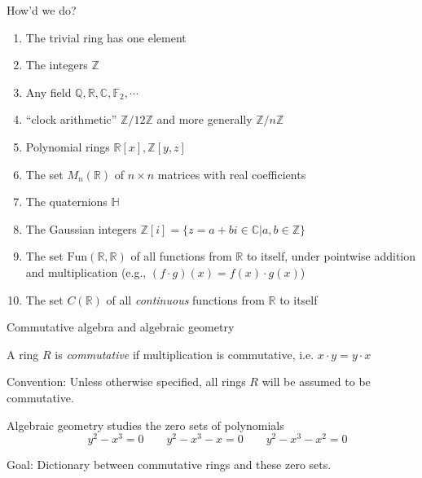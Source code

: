 \documentclass{beamer}
\newcommand{\Z}{\mathbb{Z}}
\begin{document}
\begin{frame}{How'd we do?}
\begin{enumerate}
\item The trivial ring has one element
\item The integers $\mathbb{Z}$
\item Any field $\mathbb{Q}, \mathbb{R}, \mathbb{C}, \mathbb{F}_2, \cdots$
\item ``clock arithmetic'' $\mathbb{Z}/12\mathbb{Z}$ and more generally $\mathbb{Z}/n\mathbb{Z}$
\item Polynomial rings $\mathbb{R}[x], \mathbb{\Z}[y,z]$
\item The set $M_n(\mathbb{R})$ of $n\times n$ matrices with real coefficients
\item The quaternions $\mathbb{H}$
\item The Gaussian integers $\mathbb{Z}[i]=\{z=a+bi\in \mathbb{C} | a,b\in \mathbb{Z}\}$
\item The set $\text{Fun}(\mathbb{R}, \mathbb{R})$ of all functions from $\mathbb{R}$ to itself, under pointwise addition and multiplication (e.g., $(f\cdot g)(x)=f(x)\cdot g(x)$)
\item The set $C(\mathbb{R})$ of all \emph{continuous} functions from $\mathbb{R}$ to itself
\end{enumerate}
\end{frame}


\begin{frame}{Commutative algebra and algebraic geometry}

\begin{definition}
A ring $R$ is \emph{commutative} if multiplication is commutative, i.e. $x\cdot y=y\cdot x$
\end{definition}

\begin{block}{Convention:}
Unless otherwise specified, all rings $R$ will be assumed to be commutative.
\end{block}

\begin{block}{Algebraic geometry studies the zero sets of polynomials}
$$\quad y^2-x^3=0\quad \quad y^2-x^3-x =0 \quad \quad y^2-x^3-x^2=0$$
  \end{block}
\begin{block}{Goal:}
Dictionary between commutative rings and these zero sets.
  \end{block}

\end{frame}
\end{document}
